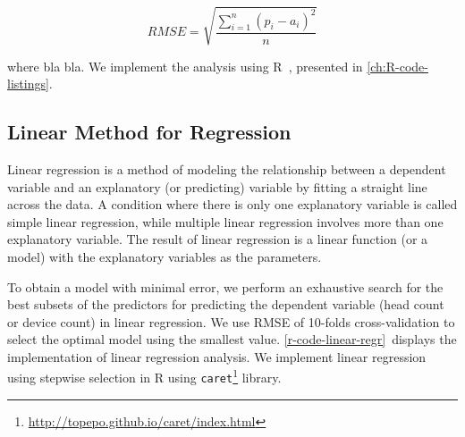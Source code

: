 \begin{equation} \label{eq:rmse}
 RMSE=\sqrt { \frac { \sum _{ i=1 }^{ n }{ { \left( { p }_{ i }-{ a }_{ i } \right)  }^{ 2 } }  }{ n }  } 
\end{equation}

where bla bla. We implement the analysis using R~\cite{r-team}, presented in \autoref{ch:R-code-listings}.


	\subsection{Linear Method for Regression} %
	\label{sub:linear_estimator}
	Linear regression is a method of modeling the relationship between a dependent variable and an explanatory (or predicting) variable by fitting a straight line across the data. A condition where there is only one explanatory variable is called simple linear regression, while multiple linear regression involves more than one explanatory variable. The result of linear regression is a linear function (or a model) with the explanatory variables as the parameters.

	To obtain a model with minimal error, we perform an exhaustive search for the best subsets of the predictors for predicting the dependent variable (head count or device count) in linear regression. We use \ac{RMSE} of 10-folds cross-validation to select the optimal model using the smallest value. \autoref{r-code-linear-regr}~displays the implementation of linear regression analysis. We implement linear regression using stepwise selection in R using \verb|caret|\footnote{\url{http://topepo.github.io/caret/index.html}} library.
	
